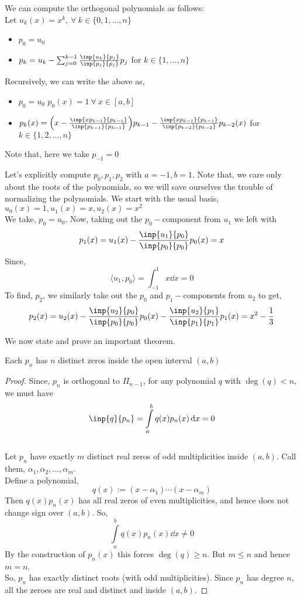 \begin{tcolorbox}[
  colback = orange!10,
  colframe = red!75
]
We can compute the orthogonal polynomials as follows:\\
\bigskip  
Let $ u_k(x)=x^k, \ \forall \ k \in \{0,1,\ldots,n\} $ 
\begin{itemize}
  \item $ p_0=u_0 $ 
  \item $ p_k = u_k - \sum_{j=0}^{k-1}\frac{\inp{u_k}{p_j}}{\inp{p_j}{p_j}}p_j $ for $ k\in\{1,\ldots,n\} $ 
\end{itemize}
\bigskip
Recursively, we can write the above as,
\begin{itemize}
  \item $p_0=u_0$ \thatis $ p_0(x)=1 \ \forall \ x \in [a,b] $ 
  \item $ p_k(x)=\Bigl(x-\frac{\inp{xp_{k-1}}{p_{k-1}}}{\inp{p_{k-1}}{p_{k-1}}}\Bigr)p_{k-1} - \frac{\inp{xp_{k-1}}{p_{k-1}}}{\inp{p_{k-2}}{p_{k-2}}}p_{k-2}(x) $ for $ k \in \{1,2,\ldots,n\} $ 
\end{itemize}
\bigskip
Note that, here we take $ p_{-1}=0 $ 
\end{tcolorbox}

\begin{example}
  Let's explicitly compute $ p_0,p_1,p_2 $ with $ a=-1,b=1 $. Note that, we care only about the roots of the polynomials, so we will save ourselves the trouble of normalizing the polynomials. We start with the usual basis, $ u_0(x)=1,u_1(x)=x,u_2(x)=x^2 $\\ 
  We take, $ p_0=u_0 $. Now, taking out the $ p_0-$component from $ u_1 $ we left with \[p_1(x)=u_1(x)-\frac{\inp{u_1}{p_0}}{\inp{p_0}{p_0}}p_0(x)=x\]
  Since, \[\langle u_1,p_0 \rangle = \int_{-1}^{1}x\dd{x} = 0\]
  To find, $p_2$, we similarly take out the $ p_0 $ and $p_1-$components from $ u_2 $ to get, \[p_2(x)=u_2(x)-\frac{\inp{u_2}{p_0}}{\inp{p_0}{p_0}}p_0(x) - \frac{\inp{u_2}{p_1}}{\inp{p_1}{p_1}}p_1(x)=x^2 - \frac{1}{3}\]
\end{example}
We now state and prove an important theorem.
\begin{thm}
  Each $ p_n $ has $ n $ distinct zeros inside the open interval $ (a,b) $
\end{thm}
\begin{proof}[Proof]
  Since, $ p_n $ is orthogonal to $ \Pi_{n-1} $, for any polynomial $ q $ with $\deg(q) < n $, we must have 
  $$ \inp{q}{p_n} = \int \limits_a^b q(x)p_n(x)\dd{x} = 0 $$
  \\ 
  Let $ p_n $  have exactly $ m $  distinct real zeros of odd multiplicities inside $ (a,b) $. Call them, $ \alpha_1,\alpha_2,\ldots,\alpha_m $.\\ 
  Define a polynomial, $$ q(x) := (x-\alpha_1)\cdots(x-\alpha_m) $$
  Then $ q(x)p_n(x) $  has all real zeros of even multiplicities, and hence does not change sign over $ (a,b) $. So, 
  $$ \int \limits_a^b q(x)p_n(x)\dd{x} \not = 0 $$
  By the construction of $ p_n(x) $  this forces $ \deg(q) \geq n $. But $ m\leq n $ and hence $ m=n $.\\
  So, $ p_n $  has exactly  distinct roots (with odd multiplicities). Since $ p_n $  has degree $ n $,  all the zeroes are real and distinct and inside $ (a,b) $.
\end{proof}
